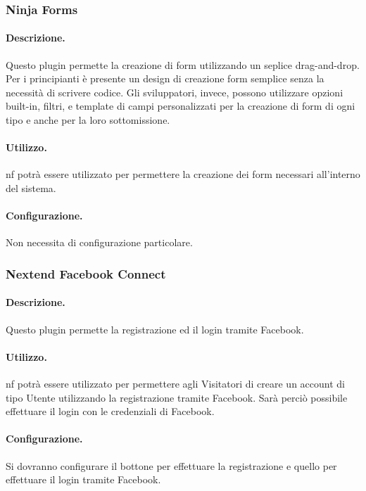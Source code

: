 \subsubsection{Ninja Forms}
\paragraph{Descrizione.} Questo plugin permette la creazione di form utilizzando un seplice drag-and-drop. Per i principianti è presente un design di creazione form semplice senza la necessità di scrivere codice. Gli sviluppatori, invece, possono utilizzare opzioni built-in, filtri, e template di campi personalizzati per la creazione di form di ogni tipo e anche per la loro sottomissione.
\paragraph{Utilizzo.} \gls{nf} potrà essere utilizzato per permettere la creazione dei form necessari all'interno del sistema.
\paragraph{Configurazione.} Non necessita di configurazione particolare.

\subsubsection{Nextend Facebook Connect}
\paragraph{Descrizione.} Questo plugin permette la registrazione ed il login tramite Facebook.
\paragraph{Utilizzo.} \gls{nf} potrà essere utilizzato per permettere agli Visitatori di creare un account di tipo Utente utilizzando la registrazione tramite Facebook. Sarà perciò possibile effettuare il login con le credenziali di Facebook.
\paragraph{Configurazione.} Si dovranno configurare il bottone per effettuare la registrazione e quello per effettuare il login tramite Facebook.